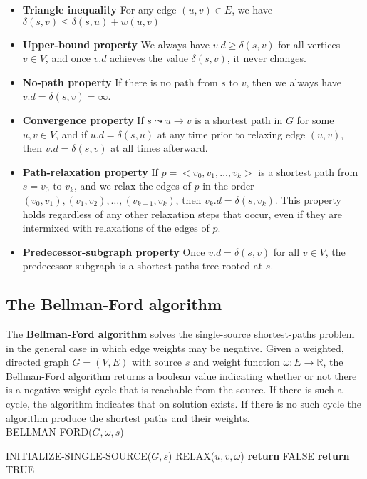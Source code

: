 \documentclass[12pt]{article}
\begin{document}
\begin{itemize}
  \item \textbf{Triangle inequality} For any edge $(u,v) \in E$, we have $\delta(s,v) \le \delta(s,u) + w(u,v)$
  \item \textbf{Upper-bound property} We always have $v.d \ge \delta(s,v)$ for all vertices $v \in V$, and once $v.d$ achieves the value $\delta(s,v)$, it never changes.
  \item \textbf{No-path property} If there is no path from $s$ to $v$, then we always have $v.d = \delta(s,v) = \infty$.
  \item \textbf{Convergence property} If $s \leadsto u \rightarrow v$ is a shortest path in $G$ for some $u,v \in V$, and if $u.d = \delta(s,u)$ at any time prior to relaxing edge $(u,v)$, then $v.d = \delta(s,v)$ at all times afterward.
  \item \textbf{Path-relaxation property} If $p = <v_0, v_1, \dots, v_k>$ is a shortest path from $s = v_0 \text{ to } v_k$, and we relax the edges of $p$ in the order $(v_0, v_1), (v_1, v_2), \dots, (v_{k-1}, v_k)$, then $v_k.d = \delta(s, v_k)$. This property holds regardless of any other relaxation steps that occur, even if they are intermixed with relaxations of the edges of $p$.
  \item \textbf{Predecessor-subgraph property} Once $v.d=\delta(s,v)$ for all $v \in V$, the predecessor subgraph is a shortest-paths tree rooted at $s$.
\end{itemize}

\subsection{The Bellman-Ford algorithm}

The \textbf{Bellman-Ford algorithm} solves the single-source shortest-paths problem in the general case in which edge weights may be negative. Given a weighted, directed graph $G = (V,E)$ with source $s$ and weight function $\omega : E \rightarrow \mathbb{R}$, the Bellman-Ford algorithm returns a boolean value indicating whether or not there is a negative-weight cycle that is reachable from the source. If there is such a cycle, the algorithm indicates that on solution exists. If there is no such cycle the algorithm produce the shortest paths and their weights. \\

BELLMAN-FORD($G, \omega, s$)
\begin{algorithmic} [1]
\State INITIALIZE-SINGLE-SOURCE($G,s$)
		\State RELAX($u,v,\omega$)
        \EndFor
\EndFor
{}
		\State \textbf{return } FALSE
        \EndIf
\EndFor
\State \textbf{return } TRUE
\end{algorithmic}
\end{document}
